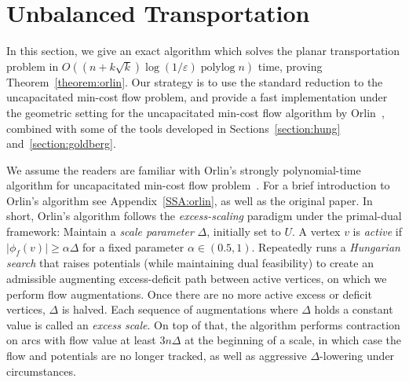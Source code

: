 \documentclass[a4paper,UKenglish]{socg-lipics-v2018}
\def\polylog{\mathop{\mathrm{polylog}}}
\def\eps{\varepsilon}
\def\abs#1{\mathopen| #1 \mathclose|}		%
\def\norm#1{\mathopen\| #1 \mathclose\|}	%
\def\tsupply{\lambda}
\def\fsupply{\phi}
\def\arcto{\mathord\shortrightarrow}
\def\arc#1#2{#1\arcto#2}
\def\cost{\operatorname{cost}}
\theoremstyle{plain}
\numberwithin{figure}{section}
\def\EMPH#1{\textcolor{BrickRed}{{\emph{#1}}}}
\begin{document}
\section{Unbalanced Transportation}
\label{section:orlin}

In this section, we give an exact algorithm which solves the planar transportation
problem in $O((n + k\sqrt{k})\log(1/\eps)\polylog n)$ time, proving Theorem~\ref{theorem:orlin}.
Our strategy is to use the standard reduction to the uncapacitated
min-cost flow problem, and provide a fast implementation under the geometric setting for the uncapacitated min-cost flow algorithm by Orlin~\cite{O93}, combined with some of the tools developed in Sections~\ref{section:hung} and~\ref{section:goldberg}.



We assume the readers are familiar with Orlin's strongly polynomial-time algorithm for uncapacitated min-cost flow problem~\cite{O93}.
For a brief introduction to Orlin's algorithm see Appendix~\ref{SSA:orlin},
as well as the original paper.
%
In short, Orlin's algorithm follows the \EMPH{excess-scaling} paradigm under the primal-dual framework:
Maintain a \EMPH{scale parameter} $\Delta$, initially set to $U$.
A vertex $v$ is \EMPH{active} if $\abs{\fsupply_f(v)} \geq \alpha\Delta$ for a fixed parameter $\alpha \in (0.5, 1)$.
Repeatedly runs a \emph{Hungarian search} that raises potentials (while maintaining dual
feasibility) to create an admissible augmenting excess-deficit path between active vertices, on which
we perform flow augmentations.
Once there are no more active excess or deficit vertices, $\Delta$ is halved.
Each sequence of augmentations where $\Delta$ holds a constant value is called
an \EMPH{excess scale}.
On top of that, the algorithm performs contraction on arcs with flow value at least $3n\Delta$ at the beginning of a scale, in which case the flow and potentials are no longer tracked, as well as aggressive $\Delta$-lowering under circumstances.
\end{document}
